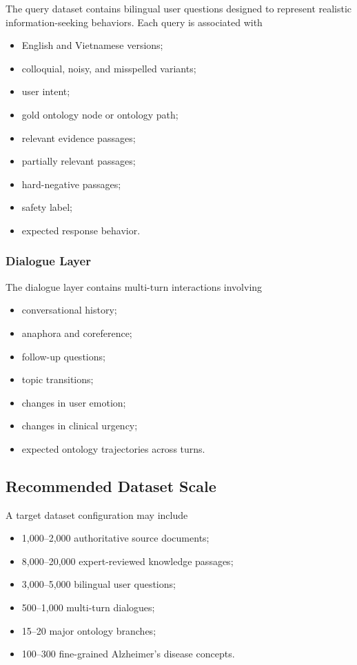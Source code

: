 \documentclass{article}
\begin{document}
The query dataset contains bilingual user questions designed to represent 
realistic information-seeking behaviors. Each query is associated with

\begin{itemize}
    \item English and Vietnamese versions;
    \item colloquial, noisy, and misspelled variants;
    \item user intent;
    \item gold ontology node or ontology path;
    \item relevant evidence passages;
    \item partially relevant passages;
    \item hard-negative passages;
    \item safety label;
    \item expected response behavior.
\end{itemize}

\subsubsection{Dialogue Layer}

The dialogue layer contains multi-turn interactions involving

\begin{itemize}
    \item conversational history;
    \item anaphora and coreference;
    \item follow-up questions;
    \item topic transitions;
    \item changes in user emotion;
    \item changes in clinical urgency;
    \item expected ontology trajectories across turns.
\end{itemize}

\subsection{Recommended Dataset Scale}

A target dataset configuration may include

\begin{itemize}
    \item 1,000--2,000 authoritative source documents;
    \item 8,000--20,000 expert-reviewed knowledge passages;
    \item 3,000--5,000 bilingual user questions;
    \item 500--1,000 multi-turn dialogues;
    \item 15--20 major ontology branches;
    \item 100--300 fine-grained Alzheimer's disease concepts.
\end{itemize}
\end{document}
